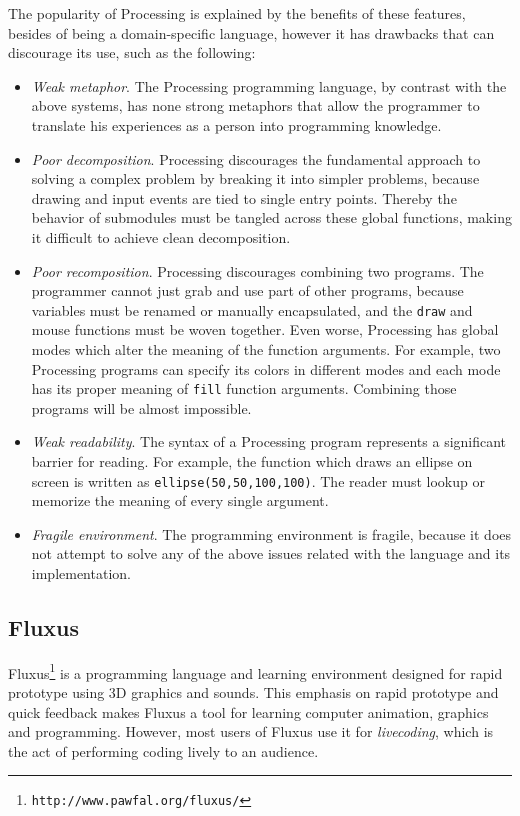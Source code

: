 The popularity of Processing is explained by the benefits of these features, besides of being a domain-specific language, however it has drawbacks that can discourage its use, such as the following:

\begin{itemize}
  \item \textit{Weak metaphor}. The Processing programming language, by contrast with the above systems, has none strong metaphors that allow the programmer to translate his experiences as a person into programming knowledge. 

  \item \textit{Poor decomposition}. Processing discourages the fundamental approach to solving a complex problem by breaking it into simpler problems, because drawing and input events are tied to single entry points. Thereby the behavior of submodules must be tangled across these global functions, making it difficult to achieve clean decomposition.

  \item \textit{Poor recomposition}. Processing discourages combining two programs. The programmer cannot just grab and use part of other programs, because variables must be renamed or manually encapsulated, and the \texttt{draw} and mouse functions must be woven together. Even worse, Processing has global modes which alter the meaning of the function arguments. For example, two Processing programs can specify its colors in different modes and each mode has its proper meaning of \texttt{fill} function arguments. Combining those programs will be almost impossible. 

  \item \textit{Weak readability}. The syntax of a Processing program represents a significant barrier for reading. For example, the function which draws an ellipse on screen is written as \texttt{ellipse(50,50,100,100)}. The reader must lookup or memorize the meaning of every single argument.

  \item \textit{Fragile environment}. The programming environment is fragile, because it does not attempt to solve any of the above issues related with the language and its implementation.
\end{itemize}

\subsection{Fluxus}
\label{subsec:fluxus}
Fluxus\footnote{\texttt{http://www.pawfal.org/fluxus/}} is a programming language and learning environment designed for rapid prototype using 3D graphics and sounds. This emphasis on rapid prototype and quick feedback makes Fluxus a tool for learning computer animation, graphics and programming. However, most users of Fluxus use it for \textit{livecoding}, which is the act of performing coding lively to an audience.

